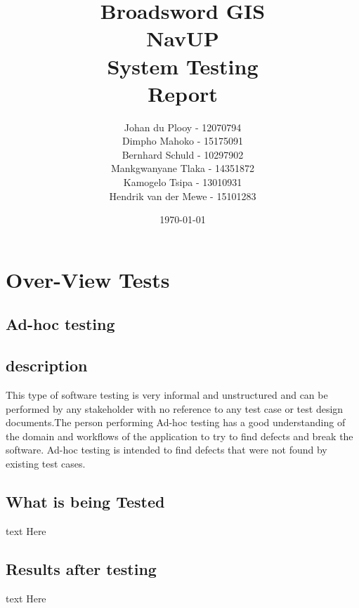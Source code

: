\documentclass[12pt]{article}
\begin{document}
\title{\Huge Broadsword GIS \\ NavUP \\ System Testing \\ Report}
\author{\Large Johan du Plooy - 12070794 \\
		\Large Dimpho Mahoko - 15175091 \\
		\Large Bernhard Schuld - 10297902 \\
		\Large Mankgwanyane Tlaka - 14351872 \\
		\Large Kamogelo Tsipa - 13010931 \\
		\Large Hendrik van der Mewe - 15101283}
\date{\today}
\maketitle

\newpage
\tableofcontents
\newpage


\section{Over-View Tests}
	
	\subsection{Ad-hoc testing}
		\subsection{description}
		This type of software testing is very informal and unstructured and can be performed by any stakeholder with no 			reference to 	any test case or test design documents.The person performing Ad-hoc testing has a good understanding of 		the domain and workflows of the application to try to find defects and break the software. Ad-hoc testing is intended to 		 find defects that were not found by existing test cases.
		
		\subsection{What is being Tested}
		text Here
		\subsection{Results after testing}
		text Here
	
\end{document}
